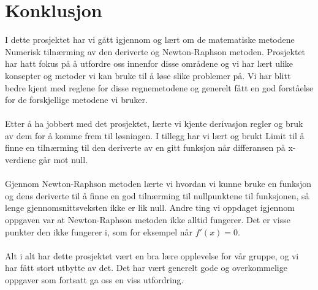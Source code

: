 \chapter{Konklusjon}

I dette prosjektet har vi gått igjennom og lært om de matematiske metodene Numerisk tilnærming av den deriverte og Newton-Raphson metoden. Prosjektet har hatt fokus på å utfordre oss innenfor disse områdene og vi har lært ulike konsepter og metoder vi kan bruke til å løse slike problemer på. Vi har blitt bedre kjent med reglene for disse regnemetodene og generelt fått en god forståelse for de forskjellige metodene vi bruker.
\\
\\ 
Etter å ha jobbert med det prosjektet, lærte vi kjente derivasjon regler og bruk av dem for å komme frem til løsningen. I tillegg har vi lært og brukt Limit til å finne en tilnærming til den deriverte av en gitt funksjon når differansen på x-verdiene går mot null. 
\\
\\ 
Gjennom Newton-Raphson metoden lærte vi hvordan vi kunne bruke en funksjon og dens deriverte til å finne en god tilnærming til nullpunktene til funksjonen, så lenge gjennomsnittsveksten ikke er lik null. Andre ting vi oppdaget igjennom oppgaven var at Newton-Raphson metoden ikke alltid fungerer. Det er visse punkter den ikke fungerer i, som for eksempel når $f'(x) = 0$. \\
\\
Alt i alt har dette prosjektet vært en bra lære opplevelse for vår gruppe, og vi har fått stort utbytte av det. Det har vært generelt gode og overkommelige oppgaver som fortsatt ga oss en viss utfordring. 